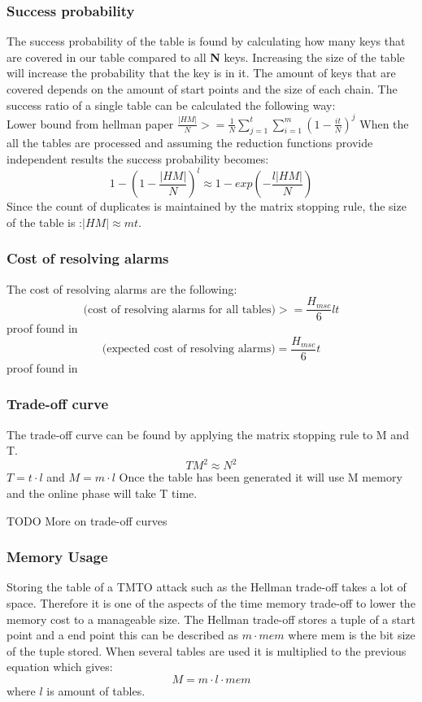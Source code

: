 \subsubsection*{Success probability}
The success probability of the table is found by calculating how many keys that are covered in our table compared to all \textbf{N} keys. Increasing the size of the table will increase the probability that the key is in it. The amount of keys that are covered depends on the amount of start points and the size of each chain. The success ratio of a single table can be calculated the following way:\\
Lower bound from hellman paper\cite{176}
$\frac{|HM|}{N}>=\frac{1}{N}\sum^{t}_{j=1}\sum^{m}_{i=1}(1-\frac{it}{N})^{j} $
When the all the tables are processed and assuming the reduction functions provide independent results the success probability becomes:
\[1-(1-\frac{|HM|}{N})^l\approx 1- exp(-\frac{l|HM|}{N})\]
Since the count of duplicates is maintained by the matrix stopping rule, the size of the table is :$|HM|\approx mt$.
\subsubsection{Cost of resolving alarms}
The cost of resolving alarms are the following:
\begin{equation}
\text{(cost of resolving alarms for all tables)}>=\frac{H_{msc}}{6}lt
\end{equation}
proof found in \cite{176}
\begin{equation}
\text{(expected cost of resolving alarms)}=\frac{H_{msc}}{6}t
\end{equation}
proof found in \cite{176}
\subsubsection{Trade-off curve}
The trade-off curve can be found by applying the matrix stopping rule to M and T.
\begin{equation}
TM^2\approx N^2
\end{equation}
$T=t \cdot l$ and $M=m\cdot l$
Once the table has been generated it will use M memory and the online phase will take T time.

TODO More on trade-off curves

\subsubsection{Memory Usage}
Storing the table of a TMTO attack such as the Hellman trade-off takes a lot of space. Therefore it is one of the aspects of the time memory trade-off to lower the memory cost to a manageable size. The Hellman trade-off stores a tuple of a start point and a end point this can be described as $m\cdot mem$ where mem is the bit size of the  tuple stored. When several tables are used it is multiplied to the previous equation which gives:
\begin{equation}
M=m\cdot l \cdot mem
\end{equation}
where $l$ is amount of tables.
